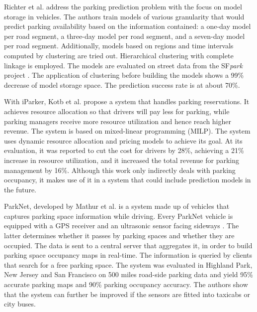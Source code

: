 Richter et al. \cite{richter} address the parking prediction problem with the focus on model storage in vehicles. The authors train models of various granularity that would predict parking availability based on the information contained: a one-day model per road segment, a three-day model per road segment, and a seven-day model per road segment. Additionally, models based on regions and time intervals computed by clustering are tried out. Hierarchical clustering with complete linkage is employed. The models are evaluated on street data from the SF\textit{park} project \cite{sfpark_open_data}. The application of clustering before building the models shows a 99\% decrease of model storage space. The prediction success rate is at about 70\%.

With iParker, Kotb et al. \cite{kotb} propose a system that handles parking reservations. It achieves resource allocation so that drivers will pay less for parking, while parking managers receive more resource utilization and hence reach higher revenue. The system is based on mixed-linear programming (MILP). The system uses dynamic resource allocation and pricing models to achieve its goal. At its evaluation, it was reported to cut the cost for drivers by 28\%, achieving a 21\% increase in resource utilization, and it increased the total revenue for parking management by 16\%. Although this work only indirectly deals with parking occupancy, it makes use of it in a system that could include prediction models in the future.


ParkNet, developed by Mathur et al. \cite{mathur} is a system made up of vehicles that captures parking space information while driving. Every ParkNet vehicle is equipped with a GPS receiver and an ultrasonic sensor facing sideways
. The latter determines whether it passes by parking spaces and whether they are occupied. The data is sent to a central server that aggregates it, in order to build parking space occupancy maps in real-time. The information is queried by clients that search for a free parking space. The system was evaluated in Highland Park, New Jersey and San Francisco on 500 miles road-side parking data and yield 95\% accurate parking maps and 90\% parking occupancy accuracy. The authors show that the system can further be improved if the sensors are fitted into taxicabs or city buses.

